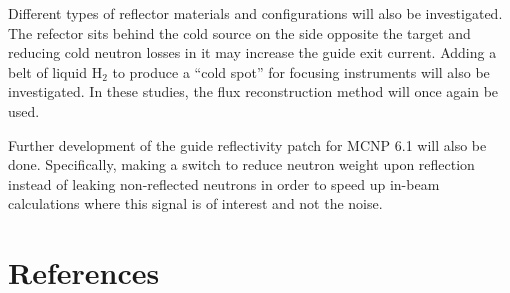\documentclass[a4paper]{jpconf}
\begin{document}
Different types of reflector materials and configurations will also be investigated.  The refector sits behind the cold source on the side opposite the target and reducing cold neutron losses in it may increase the guide exit current.  Adding a belt of liquid H$_2$ to produce a ``cold spot'' for focusing instruments will also be investigated.  In these studies, the flux reconstruction method will once again be used.

Further development of the guide reflectivity patch for MCNP 6.1 will also be done.  Specifically, making a switch to reduce neutron weight upon reflection instead of leaking non-reflected neutrons in order to speed up in-beam calculations where this signal is of interest and not the noise.

\section*{References}

\end{document}
